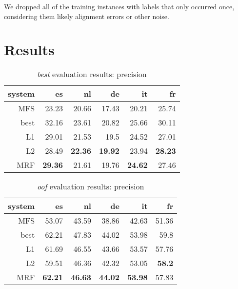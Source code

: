 \documentclass[11pt,letterpaper]{article}
\begin{document}
We dropped all of the training instances with labels that only occurred once,
considering them likely alignment errors or other noise.


\section{Results}
\begin{table}[t!]
  \begin{center}
    \begin{tabular}{|r|r|r|r|r|r|}
      \hline
      system   & es    & nl    & de    &  it   & fr \\
      \hline
   MFS  & 23.23          & 20.66          & 17.43          & 20.21          & 25.74 \\
   best & 32.16          & 23.61          & 20.82          & 25.66          & 30.11 \\
      \hline
            L1 & 29.01          & 21.53          & 19.5           & 24.52          & 27.01 \\
            L2 & 28.49          & \textbf{22.36} & \textbf{19.92} & 23.94          & \textbf{28.23} \\
           MRF & \textbf{29.36} & 21.61          & 19.76          & \textbf{24.62} & 27.46 \\
      \hline
    \end{tabular}
  \caption{\emph{best} evaluation results: precision}
  \label{table:resultsbest}
  \end{center}
\end{table}

\begin{table}[t!]
  \begin{center}
    \begin{tabular}{|r|r|r|r|r|r|}
      \hline
      system   & es    & nl    & de    &  it   & fr \\
      \hline
    MFS & 53.07          & 43.59              & 38.86          & 42.63          & 51.36 \\
   best & 62.21          & 47.83              & 44.02          & 53.98          & 59.8 \\
      \hline
           L1  & 61.69          & 46.55              & 43.66          & 53.57          & 57.76 \\
           L2  & 59.51          & 46.36              & 42.32          & 53.05          & \textbf{58.2} \\
           MRF & \textbf{62.21} & \textbf{46.63}     & \textbf{44.02} & \textbf{53.98} & 57.83 \\
      \hline
    \end{tabular}
  \caption{\emph{oof} evaluation results: precision}
  \label{table:resultsoof}
  \end{center}
\end{table}
\end{document}
